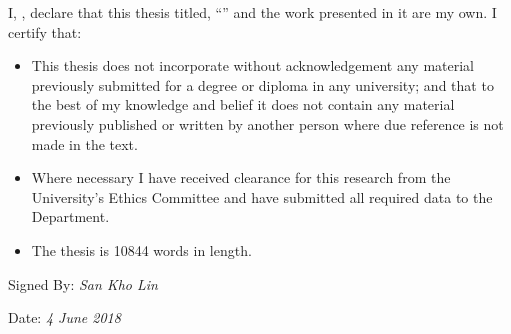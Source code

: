 \documentclass[
11pt, %
oneside, %
english, %
singlespacing, %
headsepline, %
chapterinoneline, %
consistentlayout, %
]{MastersDoctoralThesis} %
\begin{document}

\begin{declaration}
\addchaptertocentry{\authorshipname} %
\bigskip\noindent\ignorespaces

\noindent I, \authorname, declare that this thesis titled, \enquote{\ttitle} and the work presented in it are my own. I certify that:

\begin{itemize} 
\item This thesis does not incorporate without acknowledgement any material previously submitted for a degree or diploma in any university; and that to the best of my knowledge and belief it does not contain any material previously published or written by another person where due reference is not made in the text.
\item Where necessary I have received clearance for this research from the University's Ethics Committee and have submitted all required data to the Department.
\item The thesis is 10844 words in length.\\ %
\end{itemize}
 
\noindent Signed By:  \textit{San Kho Lin}
 
\noindent Date: \textit{4 June 2018}
\end{declaration}

\cleardoublepage




\end{document}
